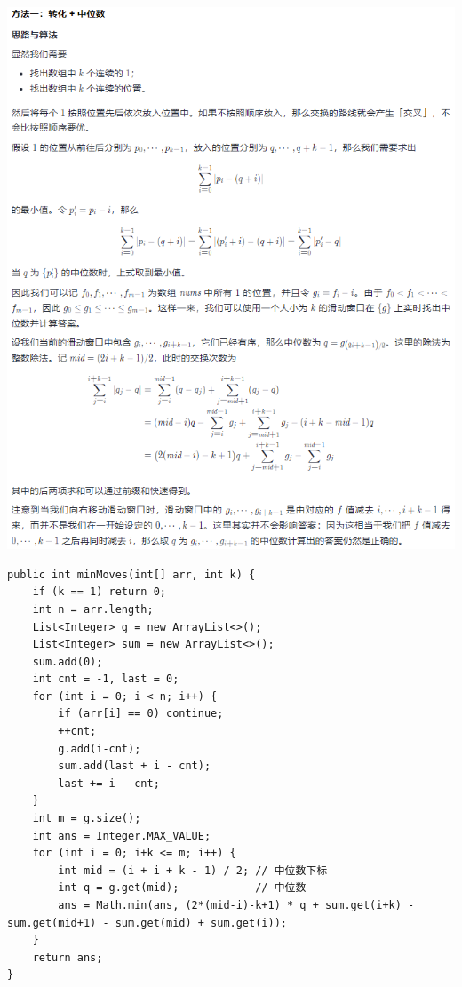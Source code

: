 \documentclass[9pt, b5paaper]{book}
\begin{document}
\includegraphics[width=.9\linewidth]{./pic/median.png}

\begin{verbatim}
public int minMoves(int[] arr, int k) {
    if (k == 1) return 0;
    int n = arr.length;
    List<Integer> g = new ArrayList<>();
    List<Integer> sum = new ArrayList<>();
    sum.add(0);
    int cnt = -1, last = 0;
    for (int i = 0; i < n; i++) {
        if (arr[i] == 0) continue;
        ++cnt;
        g.add(i-cnt);
        sum.add(last + i - cnt);
        last += i - cnt; 
    }
    int m = g.size();
    int ans = Integer.MAX_VALUE;
    for (int i = 0; i+k <= m; i++) {
        int mid = (i + i + k - 1) / 2; // 中位数下标
        int q = g.get(mid);            // 中位数
        ans = Math.min(ans, (2*(mid-i)-k+1) * q + sum.get(i+k) - sum.get(mid+1) - sum.get(mid) + sum.get(i));
    }
    return ans;
}
\end{verbatim}
\end{document}
